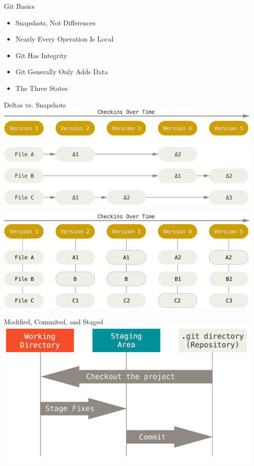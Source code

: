 \documentclass[10pt, compress]{beamer}
\begin{document}
\begin{frame}{Git Basics}
	\begin{itemize}
		\item Snapshots, Not Differences
		\item Nearly Every Operation Is Local
		\item Git Has Integrity
		\item Git Generally Only Adds Data
		\item The Three States
	\end{itemize}
\end{frame}

\begin{frame}{Deltas vs. Snapshots}
	\includegraphics[width=\textwidth*8/10]{images/deltas}
		
	\includegraphics[width=\textwidth*8/10]{images/snapshots}
\end{frame}

\begin{frame}{Modified, Commited, and Staged}
	\includegraphics[width=\textwidth]{images/areas}	
\end{frame}
\end{document}
